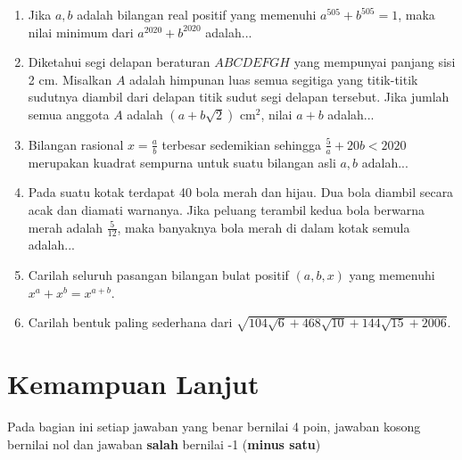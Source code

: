 \documentclass[12pt]{extarticle}
\begin{document}
\begin{enumerate}
		
		\item Jika $a,b$ adalah bilangan real positif yang memenuhi $a^{505}+b^{505}=1$, maka nilai minimum dari $a^{2020}+b^{2020}$ adalah...
		
		\item Diketahui segi delapan beraturan $ABCDEFGH$ yang mempunyai panjang sisi 2 cm. Misalkan $A$ adalah himpunan luas semua segitiga yang titik-titik sudutnya diambil dari delapan titik sudut segi delapan tersebut. Jika jumlah semua anggota $A$ adalah $(a+b\sqrt{2})$ cm$^2$, nilai $a+b$ adalah...
		
		\item Bilangan rasional $x=\frac{a}{b}$ terbesar sedemikian sehingga $\frac{5}{a}+20b < 2020$ merupakan kuadrat sempurna untuk suatu bilangan asli $a,b$ adalah...
		
		\item Pada suatu kotak terdapat 40 bola merah dan hijau. Dua bola diambil secara acak dan diamati warnanya. Jika peluang terambil kedua bola berwarna merah adalah $\frac{5}{12}$, maka banyaknya bola merah di dalam kotak semula adalah...
		
		\item Carilah seluruh pasangan bilangan bulat positif $(a,b,x)$ yang memenuhi $x^a+x^b=x^{a+b}$. 
		
		\item Carilah bentuk paling sederhana dari $\sqrt{104\sqrt{6}+468\sqrt{10}+144\sqrt{15}+2006}$.
		
	\end{enumerate}

\section{Kemampuan Lanjut}
Pada bagian ini setiap jawaban yang benar bernilai 4 poin, jawaban kosong bernilai nol
dan jawaban \textbf{salah} bernilai -1 (\textbf{minus satu})
\end{document}
